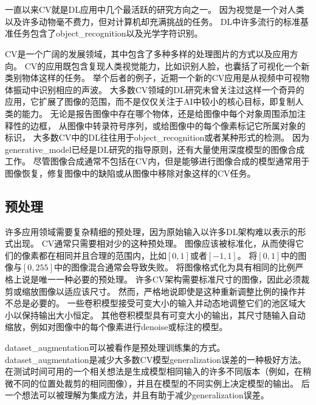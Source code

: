 \section{}
\label{sec:computer_vision}

一直以来\gls{CV}就是\gls{DL}应用中几个最活跃的研究方向之一。
因为视觉是一个对人类以及许多动物毫不费力，但对计算机却充满挑战的任务\citep{ballard1983parallel}。
\gls{DL}中许多流行的标准基准任务包含了\gls{object_recognition}以及光学字符识别。


\gls{CV}是一个广阔的发展领域，其中包含了多种多样的处理图片的方式以及应用方向。
\gls{CV}的应用既包含复现人类视觉能力，比如识别人脸，也囊括了可视化一个新类别物体这样的任务。
举个后者的例子，近期一个新的\gls{CV}应用是从视频中可视物体振动中识别相应的声波\citep{Davis2014VisualMic}。
大多数\gls{CV}领域的\gls{DL}研究未曾关注过这样一个奇异的应用，它扩展了图像的范围，而不是仅仅关注于\gls{AI}中较小的核心目标，即复制人类的能力。
无论是报告图像中存在哪个物体，还是给图像中每个对象周围添加注释性的边框，
从图像中转录符号序列，或给图像中的每个像素标记它所属对象的标识，
大多数\gls{CV}中的\gls{DL}往往用于\gls{object_recognition}或者某种形式的检测。
因为\gls{generative_model}已经是\gls{DL}研究的指导原则，还有大量使用深度模型的图像合成工作。
尽管图像合成通常不包括在\gls{CV}内，但是能够进行图像合成的模型通常用于图像恢复，修复图像中的缺陷或从图像中移除对象这样的\gls{CV}任务。

\subsection{预处理}
\label{sec:preprocessing}

许多应用领域需要复杂精细的预处理，因为原始输入以许多\gls{DL}架构难以表示的形式出现。
\gls{CV}通常只需要相对少的这种预处理。
图像应该被标准化，从而使得它们的像素都在相同并且合理的范围内，比如$[0,1]$或者$[-1,1]$。
将$[0,1]$中的图像与$[0,255]$中的图像混合通常会导致失败。
将图像格式化为具有相同的比例严格上说是唯一一种必要的预处理。
许多\gls{CV}架构需要标准尺寸的图像，因此必须裁剪或缩放图像以适应该尺寸。
然而，严格地说即使是这种重新调整比例的操作并不总是必要的。
一些卷积模型接受可变大小的输入并动态地调整它们的池区域大小以保持输出大小恒定\citep{Waibel89b}。
其他卷积模型具有可变大小的输出，其尺寸随输入自动缩放，例如对图像中的每个像素进行\gls{denoise}或标注的模型\citep{Hadsell-RSS-07}。

\gls{dataset_augmentation}可以被看作是预处理训练集的方式。
\gls{dataset_augmentation}是减少大多数\gls{CV}模型\gls{generalization}误差的一种极好方法。
在测试时间可用的一个相关想法是生成模型相同输入的许多不同版本（例如，在稍微不同的位置处裁剪的相同图像），并且在模型的不同实例上决定模型的输出。
后一个想法可以被理解为集成方法，并且有助于减少\gls{generalization}误差。

